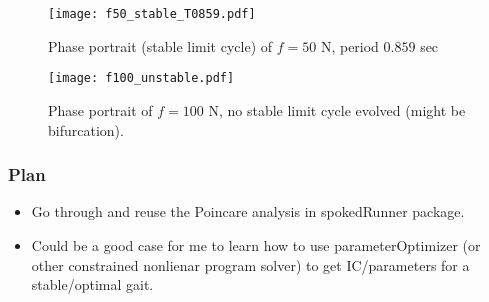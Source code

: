 \begin{figure}[H]
\centering
\texttt{[image: f50\_stable\_T0859.pdf]} 
\caption{Phase portrait (stable limit cycle) of $f = 50$ N, period $0.859$ sec}
\end{figure}

\begin{figure}[H]
\centering
\texttt{[image: f100\_unstable.pdf]} 
\caption{Phase portrait of $f = 100$ N, no stable limit cycle evolved (might be bifurcation).}
\end{figure}

\subsubsection*{Plan}
\begin{itemize}
\item Go through and reuse the Poincare analysis in spokedRunner package.
\item Could be a good case for me to learn how to use parameterOptimizer (or other constrained nonlienar program solver) to get IC/parameters for a stable/optimal gait.
\end{itemize}